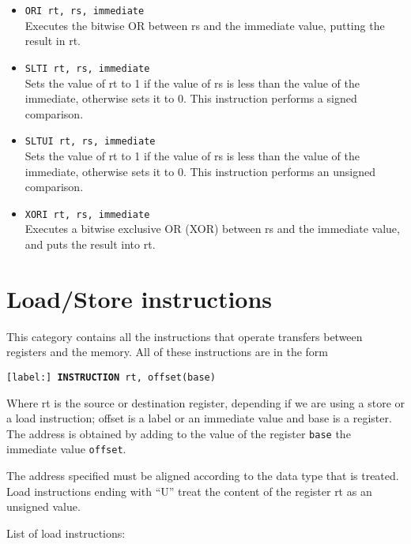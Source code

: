 \documentclass[12pt]{report}
\begin{document}
\begin{itemize}
	\item \texttt{ORI rt, rs, immediate}\\
	Executes the bitwise OR between rs and the immediate value, putting the
	result in rt.

	\item \texttt{SLTI rt, rs, immediate}\\
	Sets the value of rt to 1 if the value of rs is less than the value of the
	immediate, otherwise sets it to 0. This instruction performs a signed comparison.

	\item \texttt{SLTUI rt, rs, immediate}\\
	Sets the value of rt to 1 if the value of rs is less than the value of the
	immediate, otherwise sets it to 0. This instruction performs an unsigned comparison.

	\item \texttt{XORI rt, rs, immediate}\\
	Executes a bitwise exclusive OR (XOR) between rs and the immediate value,
	and puts the result into rt.

\end{itemize}

\section{Load/Store instructions}
This category contains all the instructions that operate transfers between
registers and the memory. All of these instructions are in the form

\begin{center}
	\texttt{[label:] \textbf{INSTRUCTION} rt, offset(base)}
\end{center}

Where rt is the source or destination register, depending if we are using a
store or a load instruction; offset is a label or an immediate value and base is
a register. The address is obtained by adding to the value of the register
\texttt{base} the immediate value \texttt{offset}.

The address specified must be aligned according to the data type that is
treated. Load instructions ending with ``U'' treat the content of the register
rt as an unsigned value.

List of load instructions:
\end{document}
